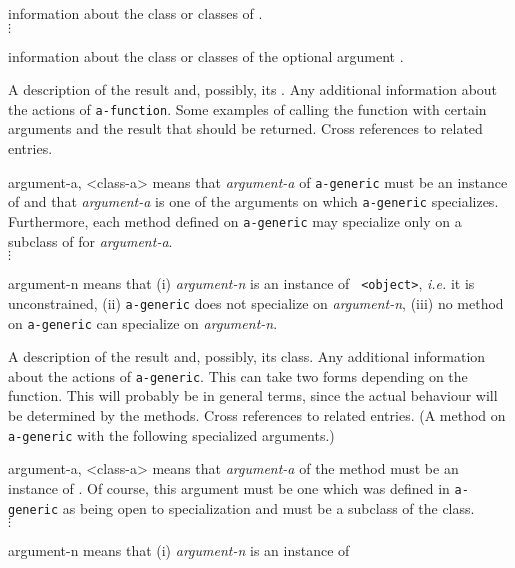 \begin{optDefinition}
%
\begin{arguments}
    \item[\sc{argument-1}] information about the class or classes of
    .\\
    $\vdots$
    \item[\scopt{argument-n}] information about the class or classes of
    the optional argument .
\end{arguments}
%
\result%
A description of the result and, possibly, its .
%
\remarks%
Any additional information about the actions of {\tt a-function}.
%
\examples
Some examples of calling the function with certain arguments and the
result that should be returned.
%
\seealso%
Cross references to related entries.
%
%
\begin{genericargs}
    \item[argument-a, <class-a>] means that {\em argument-a} of {\tt a-generic}
    must be an instance of {\tt <class-a>} and that {\em argument-a} is one of
    the arguments on which {\tt a-generic} specializes.  Furthermore, each
    method defined on {\tt a-generic} may
    specialize only on a subclass of {\tt <class-a>} for {\em argument-a}.\\
    $\vdots$
    \item[argument-n] means that (i) {\em argument-n} is an instance of {\tt
        <object>}, {\em i.e.} it is unconstrained, (ii) {\tt a-generic} does not
    specialize on {\em argument-n}, (iii) no method on {\tt a-generic} can
    specialize on {\em argument-n}.
\end{genericargs}
%
\result%
A description of the result and, possibly, its class.
%
\remarks%
Any additional information about the actions of {\tt a-generic}.  This
can take two forms depending on the function.  This will probably be
in general terms, since the actual behaviour will be determined by the
methods.
%
\seealso%
Cross references to related entries.
%
%
(A method on {\tt a-generic} with the following specialized arguments.)
%
\begin{specargs}
    \item[argument-a, <class-a>] means that {\em argument-a} of the method must
    be an instance of {\tt <class-a>}.  Of course, this argument must be one
    which was defined in {\tt a-generic} as being open to
    specialization and {\tt <class-a>} must be a subclass of the class.\\
    $\vdots$
    \item[argument-n] means that (i) {\em argument-n} is an instance of {\tt
}
\end{specargs}
\end{optDefinition}

